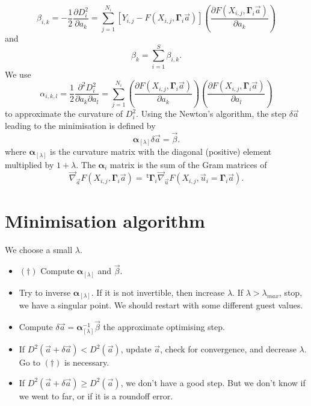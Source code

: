 \documentclass[aps,twocolumn]{revtex4}
\newcommand{\mymat}[1]{\boldsymbol{#1}}
\newcommand{\mytrn}[1]{~^{\mathsf{t}}#1}
\begin{document}
\begin{equation}
	\beta_{i,k} = -\dfrac{1}{2}\dfrac{\partial D_i^2}{\partial a_k} 
	= \sum_{j=1}^{N_i} \left[
	Y_{i,j} - F\left(X_{i,j},\mymat{\Gamma}_i \vec{a}\right)
	\right] 
	\left(\dfrac{\partial F(X_{i,j},\mymat{\Gamma}_i \vec{a})}{\partial a_k}\right)
\end{equation}
and
\begin{equation}
	\beta_k = \sum_{i=1}^{S} \beta_{i,k}.
\end{equation}
We use
\begin{equation}
	\alpha_{i,k,l} = \dfrac{1}{2} \dfrac{\partial^2 D_i^2}{\partial a_k\partial a_l} =
	\sum_{j=1}^{N_i} 
	 \left(\dfrac{\partial F(X_{i,j},\mymat{\Gamma}_i \vec{a})}{\partial a_k}\right) \left(\dfrac{\partial F(X_{i,j},\mymat{\Gamma}_i \vec{a})}{\partial a_l}\right) 
\end{equation}
to approximate the curvature of $D_i^2$.
Using the Newton's algorithm, the step $\delta\vec{a}$ leading to the minimisation is defined by
\begin{equation}
	\mymat{\alpha}_{[\lambda]} \delta\vec{a} = \vec{\beta}.
\end{equation}
where $\mymat{\alpha}_{[\lambda]}$ is the curvature matrix with the diagonal (positive) element multiplied by $1+\lambda$.
The $\mymat{\alpha}_i$ matrix is the sum of the Gram matrices
of
\begin{equation}
	\vec{\nabla}_{\vec{a}} F(X_{i,j},\mymat{\Gamma}_i \vec{a})
	= \mytrn{\mymat{\Gamma}}_i 
	 \vec{\nabla}_{\vec{u}} F(X_{i,j},\vec{u}_i = \mymat{\Gamma}_i \vec{a}).
\end{equation}

\section{Minimisation algorithm}
We choose a small $\lambda$.

\begin{itemize}
\item $(\dagger)$ Compute $\mymat{\alpha}_{[\lambda]}$ and $\vec{\beta}$.
\item Try to inverse $\mymat{\alpha}_{[\lambda]}$. If it is not invertible, then increase $\lambda$. If $\lambda>\lambda_{max}$, 
stop, we have a singular point. We should restart with some different guest values.
\item Compute $\delta\vec{a}=\mymat{\alpha}_{[\lambda]}^{-1}\vec{\beta}$ the approximate optimising step.
\item If $D^2(\vec{a}+\delta\vec{a})<D^2(\vec{a})$, update $\vec{a}$, check for convergence, and decrease $\lambda$.
Go to $(\dagger)$ is necessary.
\item If $D^2(\vec{a}+\delta\vec{a})\geq D^2(\vec{a})$, we don't have a good step.
But we don't know if we went to far, or if it is a roundoff error.
\end{itemize}
\end{document}
